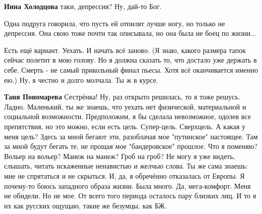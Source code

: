 \begin{itemize}
\begin{itemize}
\textbf{Инна Холодцова} таки, депрессия? Ну, дай-то Бог.

 

Одна подруга говорила, что пусть ей отпилят лучше ногу, но только не депрессия.
Она свою тоже почти так описывала, но она была не боец по жизни...

\end{itemize}

 

Есть ещё вариант. Уехать. И начать всё заново. (Я знаю, какого размера тапок
сейчас полетит в мою голову. Но я должна сказать то, что достало уже держать в
себе. Смерть - не самый прикольный финал пьесы. Хотя всё оканчивается именно
ею.) Ну, я честно и долго молчала. Ты ж в курсе.

\begin{itemize}
 
\textbf{Таня Пономарева} Сестрёнка! Ну, раз открыто решилась, то я тоже решусь.
Ладно. Маленький, ты же знаешь, что уехать нет физической, материальной и
социальной возможности. Предположим, я бы сделала невозможное, одолев все
препятствия, но это можно, если есть цель. Супер-цель. Сверхцель. А какая у
меня цель? Здесь за мной бегают эти, разоблачая мое "путинское" настоящее. Там
за мной будут бегать те, не прощая мое "бандеровское" прошлое. Что я поменяю?
Вольер на вольер? Манеж на манеж? Гроб на гроб? Не могу я уже видеть, слышать,
читать искаженные ненавистью и желчью слова. Ты же сама знаешь: мне не
спрятаться и не скрыться. И, да, я обречённо отказалась от Европы. Я почему-то
боюсь западного образа жизни. Была много. Да, мега-комфорт. Меня не обидели. Но
не мое. От всего того периода осталось пару близких лиц. И то я их как русских
ощущаю, такие же безумцы, как БЖ.

 

\end{itemize}
\end{itemize}

